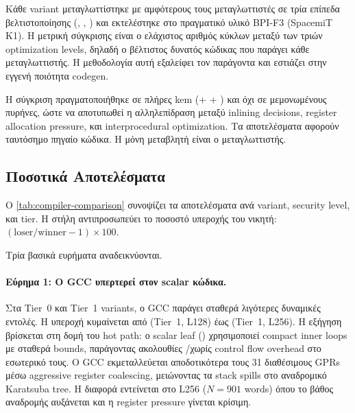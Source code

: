 Κάθε variant μεταγλωττίστηκε με αμφότερους τους μεταγλωττιστές σε τρία
επίπεδα βελτιστοποίησης (, , ) και
εκτελέστηκε στο πραγματικό υλικό BPI-F3 (SpacemiT K1). Η μετρική σύγκρισης είναι ο ελάχιστος
αριθμός κύκλων μεταξύ των τριών optimization levels, δηλαδή ο βέλτιστος
δυνατός κώδικας που παράγει κάθε μεταγλωττιστής. Η μεθοδολογία αυτή
εξαλείφει τον παράγοντα  και εστιάζει στην εγγενή
ποιότητα codegen.

Η σύγκριση πραγματοποιήθηκε σε πλήρες \gls{kem} (\KeyGen + \Encaps +
\Decaps) και όχι σε μεμονωμένους πυρήνες, ώστε να αποτυπωθεί η
αλληλεπίδραση μεταξύ inlining decisions, register allocation pressure,
και interprocedural optimization. Τα αποτελέσματα αφορούν ταυτόσημο
πηγαίο κώδικα. Η μόνη μεταβλητή είναι ο μεταγλωττιστής.

\subsection{Ποσοτικά Αποτελέσματα}
\label{ssec:compiler-results}

Ο \cref{tab:compiler-comparison} συνοψίζει τα αποτελέσματα ανά variant,
security level, και tier. Η στήλη  αντιπροσωπεύει το ποσοστό
υπεροχής του νικητή: $(\text{loser} / \text{winner} - 1) \times 100$.

\begin{table}[htbp]
  \centering
  \caption{Συγκριτική αξιολόγηση Clang~20.1.2 vs GCC~14.2.0 (πλήρες \KEM,
    πραγματικό υλικό BPI-F3 / K1, $\VLEN = \num{256}$). Για κάθε ζεύγος
    (variant, level) αναφέρεται ο βέλτιστος αριθμός κύκλων μεταξύ
    //.}
  \label{tab:compiler-comparison}
  \small
  
\end{table}

Τρία βασικά ευρήματα αναδεικνύονται.

\paragraph{Εύρημα 1: Ο GCC υπερτερεί στον scalar κώδικα.}
Στα Tier~0 και Tier~1 variants, ο GCC παράγει σταθερά λιγότερες δυναμικές
εντολές. Η υπεροχή κυμαίνεται από  (Tier~1, L128)
έως  (Tier~1, L256). Η εξήγηση βρίσκεται στη
δομή του hot path: ο scalar leaf () χρησιμοποιεί
compact inner loops με σταθερά bounds, παράγοντας ακολουθίες
\clmul/\clmulh χωρίς control flow overhead στο εσωτερικό τους.
Ο GCC εκμεταλλεύεται αποδοτικότερα τους \num{31} διαθέσιμους GPRs μέσω
aggressive register coalescing, μειώνοντας τα stack spills στο αναδρομικό
Karatsuba tree. Η διαφορά εντείνεται στο L256 ($N = \num{901}$ words)
όπου το βάθος αναδρομής αυξάνεται και η register pressure γίνεται κρίσιμη.

